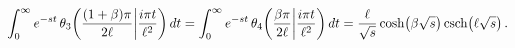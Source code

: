 \[\int_{0}^{\infty}e^{-st}\mathop{\theta_{3}\/}\nolimits\!\left(\frac{(1+\beta)%
\pi}{2\ell}\middle|\frac{i\pi t}{\ell^{2}}\right)dt=\int_{0}^{\infty}e^{-st}%
\mathop{\theta_{4}\/}\nolimits\!\left(\frac{\beta\pi}{2\ell}\middle|\frac{i\pi
t%
}{\ell^{2}}\right)dt=\frac{\ell}{\sqrt{s}}\mathop{\cosh\/}\nolimits\!\left(%
\beta\sqrt{s}\right)\mathop{\mathrm{csch}\/}\nolimits\!\left(\ell\sqrt{s}%
\right).\]